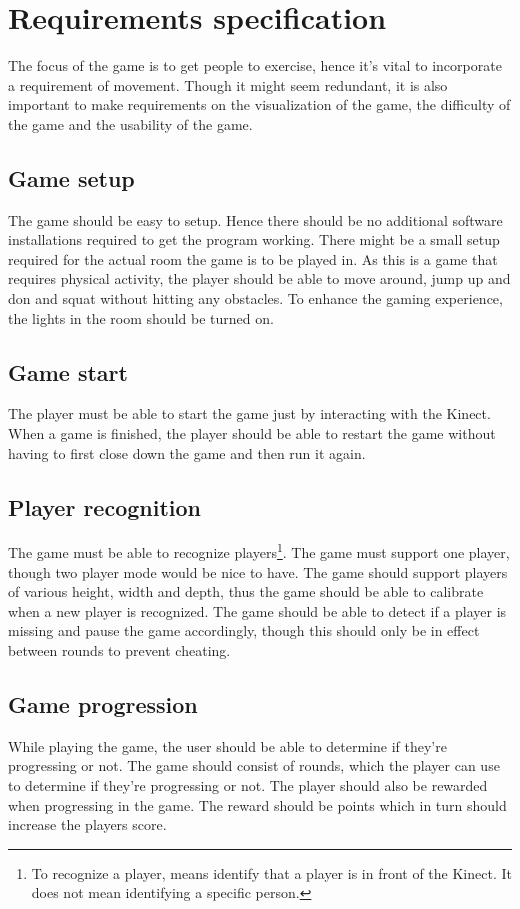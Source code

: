\documentclass[11pt]{report}
\begin{document}
\section{Requirements specification}
The focus of the game is to get people to exercise, hence it's vital to incorporate a requirement of movement. Though it might seem redundant, it is also important to make requirements on the visualization of the game, the difficulty of the game and the usability of the game.

\subsection{Game setup}
The game should be easy to setup. Hence there should be no additional software installations required to get the program working. There might be a small setup required for the actual room the game is to be played in. As this is a game that requires physical activity, the player should be able to move around, jump up and don and squat without hitting any obstacles. To enhance the gaming experience, the lights in the room should be turned on.

\subsection{Game start}
The player must be able to start the game just by interacting with the Kinect. When a game is finished, the player should be able to restart the game without having to first close down the game and then run it again.

\subsection{Player recognition}
The game must be able to recognize players\footnote{ To recognize a player, means identify that a player is in front of the Kinect. It does not mean identifying a specific person.}. The game must support one player, though two player mode would be nice to have. The game should support players of various height, width and depth, thus the game should be able to calibrate when a new player is recognized. The game should be able to detect if a player is missing and pause the game accordingly, though this should only be in effect between rounds to prevent cheating.

\subsection{Game progression}
While playing the game, the user should be able to determine if they're progressing or not. The game should consist of rounds, which the player can use to determine if they're progressing or not. The player should also be rewarded when progressing in the game. The reward should be points which in turn should increase the players score.
\end{document}
